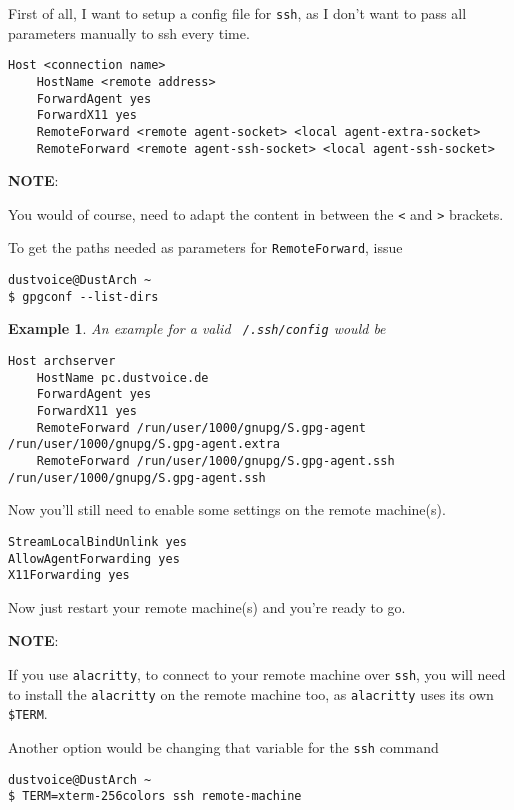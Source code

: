 \documentclass[9pt]{report}
\newcommand{\admonition}[2]{\textbf{#1}: {#2}}
\newtheorem{example}{Example}
\begin{document}
First of all, I want to setup a config file for \texttt{ssh}, as I don’t want to pass all parameters manually to ssh every time.


\begin{verbatim}
Host <connection name>
    HostName <remote address>
    ForwardAgent yes
    ForwardX11 yes
    RemoteForward <remote agent-socket> <local agent-extra-socket>
    RemoteForward <remote agent-ssh-socket> <local agent-ssh-socket>
\end{verbatim}

\admonition{NOTE}{You would of course, need to adapt the content in between the \texttt{<} and \texttt{>} brackets.


To get the paths needed as parameters for \texttt{RemoteForward}, issue


}
\begin{verbatim}
dustvoice@DustArch ~
$ gpgconf --list-dirs
\end{verbatim}
\begin{example}
An example for a valid \texttt{~/.ssh/config} would be


\begin{verbatim}
Host archserver
    HostName pc.dustvoice.de
    ForwardAgent yes
    ForwardX11 yes
    RemoteForward /run/user/1000/gnupg/S.gpg-agent /run/user/1000/gnupg/S.gpg-agent.extra
    RemoteForward /run/user/1000/gnupg/S.gpg-agent.ssh /run/user/1000/gnupg/S.gpg-agent.ssh
\end{verbatim}
\end{example}

Now you’ll still need to enable some settings on the remote machine(s).


\begin{verbatim}
StreamLocalBindUnlink yes
AllowAgentForwarding yes
X11Forwarding yes
\end{verbatim}

Now just restart your remote machine(s) and you’re ready to go.


\admonition{NOTE}{If you use \texttt{alacritty}, to connect to your remote machine over \texttt{ssh}, you will need to install the \texttt{alacritty} on the remote machine too, as \texttt{alacritty} uses its own \texttt{\$TERM}.


Another option would be changing that variable for the \texttt{ssh} command


}
\begin{verbatim}
dustvoice@DustArch ~
$ TERM=xterm-256colors ssh remote-machine
\end{verbatim}
\end{document}
